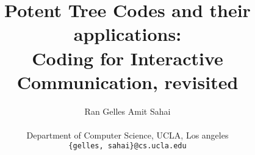 \documentclass[ letterpaper, 11pt]{article}
\begin{document}
\title{\textbf{Potent Tree Codes and their applications}: \\
Coding for Interactive Communication, revisited}
\author{Ran Gelles  \;\;\; Amit Sahai
 \\ \\ Department of Computer Science, UCLA, Los angeles
\\ \texttt{\{gelles, sahai\}@cs.ucla.edu}}
\date{}
\maketitle



\newcommand{\sectionline}{\nointerlineskip \vspace{\baselineskip}\hspace{\fill}\rule{0.5\linewidth}{.7pt}\hspace{\fill}\par\nointerlineskip \vspace{\baselineskip}
}
\end{document}
